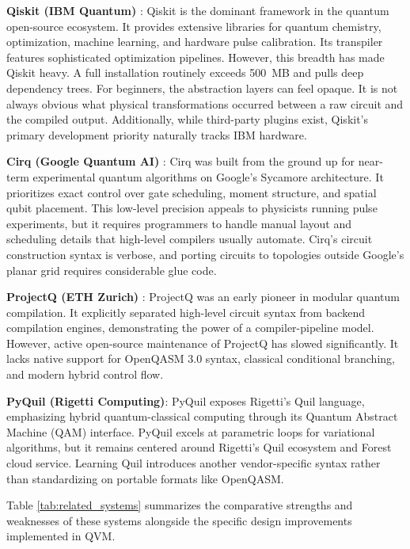 \textbf{Qiskit (IBM Quantum)} \cite{qiskit2023}: Qiskit is the dominant framework in the quantum open-source ecosystem. It provides extensive libraries for quantum chemistry, optimization, machine learning, and hardware pulse calibration. Its transpiler features sophisticated optimization pipelines. However, this breadth has made Qiskit heavy. A full installation routinely exceeds 500~MB and pulls deep dependency trees. For beginners, the abstraction layers can feel opaque. It is not always obvious what physical transformations occurred between a raw circuit and the compiled output. Additionally, while third-party plugins exist, Qiskit's primary development priority naturally tracks IBM hardware.

\textbf{Cirq (Google Quantum AI)} \cite{cirq2020}: Cirq was built from the ground up for near-term experimental quantum algorithms on Google's Sycamore architecture. It prioritizes exact control over gate scheduling, moment structure, and spatial qubit placement. This low-level precision appeals to physicists running pulse experiments, but it requires programmers to handle manual layout and scheduling details that high-level compilers usually automate. Cirq's circuit construction syntax is verbose, and porting circuits to topologies outside Google's planar grid requires considerable glue code.

\textbf{ProjectQ (ETH Zurich)} \cite{haner2018}: ProjectQ was an early pioneer in modular quantum compilation. It explicitly separated high-level circuit syntax from backend compilation engines, demonstrating the power of a compiler-pipeline model. However, active open-source maintenance of ProjectQ has slowed significantly. It lacks native support for OpenQASM 3.0 syntax, classical conditional branching, and modern hybrid control flow.

\textbf{PyQuil (Rigetti Computing)}: PyQuil exposes Rigetti's Quil language, emphasizing hybrid quantum-classical computing through its Quantum Abstract Machine (QAM) interface. PyQuil excels at parametric loops for variational algorithms, but it remains centered around Rigetti's Quil ecosystem and Forest cloud service. Learning Quil introduces another vendor-specific syntax rather than standardizing on portable formats like OpenQASM.

Table \ref{tab:related_systems} summarizes the comparative strengths and weaknesses of these systems alongside the specific design improvements implemented in QVM.

\vspace{0.5cm}

